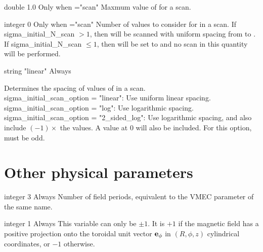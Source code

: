 {double}
{1.0}
{Only when ={\ttfamily "scan"}}
{Maxmum value of  for a scan.
}

\myhrule

{integer}
{0}
{Only when ={\ttfamily "scan"}}
{Number of values to consider for  in a scan. If {\ttfamily sigma\_initial\_N\_scan} $>1$, then  will be scanned with uniform spacing from  to .
If {\ttfamily sigma\_initial\_N\_scan} $\le 1$, then  will be set to  and no scan in
this quantity will be performed.
}

\myhrule

{string}
{{\ttfamily "linear"}}
{Always}
{Determines the spacing of values of  in a scan.\\

{\ttfamily sigma\_initial\_scan\_option} = {\ttfamily "linear"}: Use uniform linear spacing.\\

{\ttfamily sigma\_initial\_scan\_option} = {\ttfamily "log"}: Use logarithmic spacing.\\

{\ttfamily sigma\_initial\_scan\_option} = {\ttfamily "2\_sided\_log"}: Use logarithmic spacing, and also include $(-1)\times$ the values. A value at 0 will also be included. For this option,  must be odd.

}

\myhrule



\section{Other physical parameters}

{integer}
{3}
{Always}
{Number of field periods, equivalent to the VMEC parameter of the same name.}

\myhrule

{integer}
{1}
{Always}
{This variable can only be $\pm 1$. It is $+1$ if the magnetic field has a positive projection onto the toroidal unit vector ${\mathbf e}_\phi$
in $(R,\phi,z)$ cylindrical coordinates, or $-1$ otherwise.}

